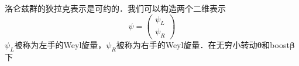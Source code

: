 
洛仑兹群的狄拉克表示是可约的．我们可以构造两个二维表示
\begin{equation}
\psi = \begin{pmatrix}
\psi_L \\
\psi_R
\end{pmatrix}
\end{equation}
$\psi_L$被称为左手的Weyl旋量，$\psi_R$被称为右手的Weyl旋量．在无穷小转动$\mathbf \theta$和boost$\mathbf \beta$下


